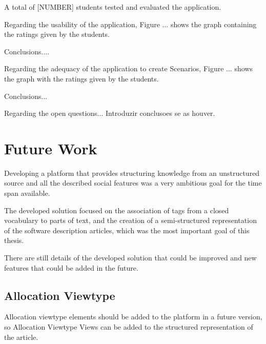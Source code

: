 \documentclass[conference]{IEEEtran}
\begin{document}
A total of [NUMBER] students tested and evaluated the application. 

Regarding the usability of the application, Figure ... shows the graph containing the ratings given by the students.

Conclusions....

Regarding the adequacy of the application to create Scenarios, Figure ... shows the graph with the ratings given by the students.

Conclusions...
\begin{figure}
\centering
{}
\end{figure}

Regarding the open questions... Introduzir conclusoes se as houver.
 

\section{Future Work}
\label{futureWork}
Developing a platform that provides structuring knowledge from an unstructured source and all the described social features was a very ambitious goal for the time span available. 

The developed solution focused on the association of tags from a closed vocabulary to parts of text, and the creation of a semi-structured representation of the software description articles, which was the most important goal of this thesis.

There are still details of the developed solution that could be improved and new features that could be added in the future.

\subsection{Allocation Viewtype}
Allocation viewtype elements should be added to the platform in a future version, so Allocation Viewtype Views can be added to the structured representation of the article.
\end{document}
